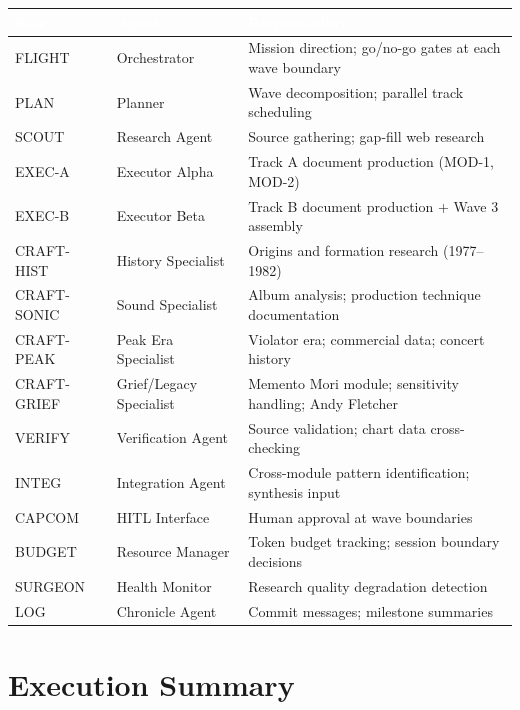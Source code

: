 \documentclass[11pt,letterpaper]{article}
\newcommand{\tableheader}[1]{\textbf{\sffamily\textcolor{white}{#1}}}
\begin{document}
\begin{center}
\begin{tabularx}{\textwidth}{L{2cm}L{3cm}X}
\toprule
{}
\tableheader{Role} & \tableheader{Agent} & \tableheader{Responsibility} \\
\midrule
FLIGHT & Orchestrator & Mission direction; go/no-go gates at each wave boundary \\
PLAN & Planner & Wave decomposition; parallel track scheduling \\
SCOUT & Research Agent & Source gathering; gap-fill web research \\
EXEC-A & Executor Alpha & Track A document production (MOD-1, MOD-2) \\
EXEC-B & Executor Beta & Track B document production + Wave 3 assembly \\
CRAFT-HIST & History Specialist & Origins and formation research (1977--1982) \\
CRAFT-SONIC & Sound Specialist & Album analysis; production technique documentation \\
CRAFT-PEAK & Peak Era Specialist & Violator era; commercial data; concert history \\
CRAFT-GRIEF & Grief/Legacy Specialist & Memento Mori module; sensitivity handling; Andy Fletcher \\
VERIFY & Verification Agent & Source validation; chart data cross-checking \\
INTEG & Integration Agent & Cross-module pattern identification; synthesis input \\
CAPCOM & HITL Interface & Human approval at wave boundaries \\
BUDGET & Resource Manager & Token budget tracking; session boundary decisions \\
SURGEON & Health Monitor & Research quality degradation detection \\
LOG & Chronicle Agent & Commit messages; milestone summaries \\
\bottomrule
\end{tabularx}
\end{center}

\section{Execution Summary}
\end{document}
